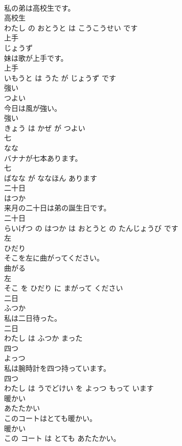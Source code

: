 \documentclass[8pt]{extreport}
\begin{document}
\begin{CJK}{UTF8}{min}
\\	私の弟は高校生です。	
\\	高校生 
\\	わたし の おとうと は こうこうせい です			
\\	上手	
\\	じょうず			
\\	妹は歌が上手です。	
\\	上手 
\\	いもうと は うた が じょうず です			
\\	強い	
\\	つよい			
\\	今日は風が強い。	
\\	強い 
\\	きょう は かぜ が つよい			
\\	七	
\\	なな			
\\	バナナが七本あります。	
\\	七 
\\	ばなな が ななほん あります			
\\	二十日	
\\	はつか			
\\	来月の二十日は弟の誕生日です。	
\\	二十日 
\\	らいげつ の はつか は おとうと の たんじょうび です			
\\	左	
\\	ひだり			
\\	そこを左に曲がってください。	
\\	曲がる 
\\	左 
\\	そこ を ひだり に まがって ください			
\\	二日	
\\	ふつか			
\\	私は二日待った。	
\\	二日 
\\	わたし は ふつか まった			
\\	四つ	
\\	よっつ			
\\	私は腕時計を四つ持っています。	
\\	四つ 
\\	わたし は うでどけい を よっつ もって います			
\\	暖かい	
\\	あたたかい			
\\	このコートはとても暖かい。	
\\	暖かい 
\\	この コート は とても あたたかい。			

\end{CJK}
\end{document}
